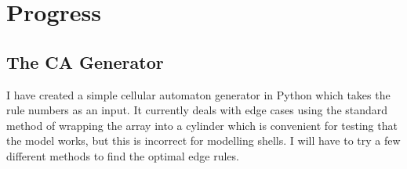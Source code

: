 \documentclass[a4paper,11pt]{report}
\begin{document}
\chapter{Progress}

\section{The CA Generator}
I have created a simple cellular automaton generator in Python which takes the rule numbers as an input. It currently deals with edge cases using the standard method of wrapping the array into a cylinder which is convenient for testing that the model works, but this is incorrect for modelling shells. I will have to try a few different methods to find the optimal edge rules.





{}


\end{document}
